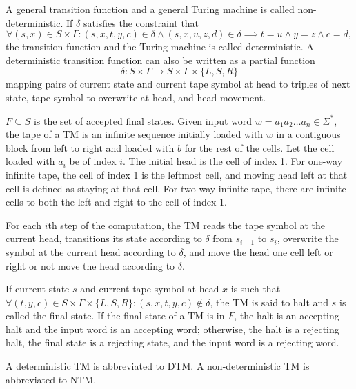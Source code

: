 \documentclass[a4paper,12pt]{article}
\begin{document}
A general transition function and a general Turing machine is called non-deterministic. If $\delta$ satisfies the constraint that
\[\forall (s,x)\in S\times\Gamma\colon(s,x,t,y,c)\in\delta\land(s,x,u,z,d)\in\delta\implies t=u\land y=z\land c=d,\]
the transition function and the Turing machine is called deterministic. A deterministic transition function can also be written as a partial function
\[\delta\colon  S\times\Gamma\to S\times\Gamma\times\{L,S,R\}\]
mapping pairs of current state and current tape symbol at head to triples of next state, tape symbol to overwrite at head, and head movement.
\item $F\subseteq S$ is the set of accepted final states.
\eit
Given input word $w=a_1a_2\ldots a_n\in\Sigma^*$, the tape of a TM is an infinite sequence initially loaded with $w$ in a contiguous block from left to right and loaded with $b$ for the rest of the cells. Let the cell loaded with $a_i$ be of index $i$. The initial head is the cell of index 1. For one-way infinite tape, the cell of index 1 is the leftmost cell, and moving head left at that cell is defined as staying at that cell. For two-way infinite tape, there are infinite cells to both the left and right to the cell of index 1.

For each $i$th step of the computation, the TM reads the tape symbol at the current head, transitions its state according to $\delta$ from $s_{i-1}$ to $s_i$, overwrite the symbol at the current head according to $\delta$, and move the head one cell left or right or not move the head according to $\delta$.

If current state $s$ and current tape symbol at head $x$ is such that $\forall (t,y,c)\in S\times\Gamma\times\{L,S,R\}\colon(s,x,t,y,c)\notin\delta$, the TM is said to halt and $s$ is called the final state. If the final state of a TM is in $F$, the halt is an accepting halt and the input word is an accepting word; otherwise, the halt is a rejecting halt, the final state is a rejecting state, and the input word is a rejecting word.

A deterministic TM is abbreviated to DTM. A non-deterministic TM is abbreviated to NTM.
\end{document}
